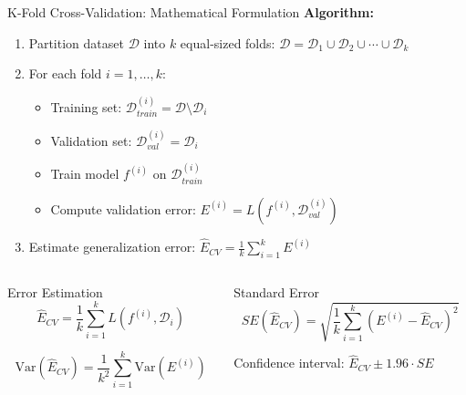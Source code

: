 \documentclass[8pt,aspectratio=1610]{beamer}
\begin{document}
\begin{frame}{K-Fold Cross-Validation: Mathematical Formulation}
\textbf{Algorithm:}
\begin{enumerate}
\setlength{\itemsep}{3pt}
\item Partition dataset $\mathcal{D}$ into $k$ equal-sized folds: $\mathcal{D} = \mathcal{D}_1 \cup \mathcal{D}_2 \cup \cdots \cup \mathcal{D}_k$
\item For each fold $i = 1, \ldots, k$:
\begin{itemize}
\item Training set: $\mathcal{D}_{train}^{(i)} = \mathcal{D} \setminus \mathcal{D}_i$
\item Validation set: $\mathcal{D}_{val}^{(i)} = \mathcal{D}_i$
\item Train model $f^{(i)}$ on $\mathcal{D}_{train}^{(i)}$
\item Compute validation error: $E^{(i)} = L(f^{(i)}, \mathcal{D}_{val}^{(i)})$
\end{itemize}
\item Estimate generalization error: $\hat{E}_{CV} = \frac{1}{k}\sum_{i=1}^k E^{(i)}$
\end{enumerate}

\vspace{0.3cm}

\begin{columns}[t]
\begin{column}{0.48\textwidth}
\begin{block}{Error Estimation}
$$\hat{E}_{CV} = \frac{1}{k}\sum_{i=1}^k L(f^{(i)}, \mathcal{D}_i)$$

$$\text{Var}(\hat{E}_{CV}) = \frac{1}{k^2}\sum_{i=1}^k \text{Var}(E^{(i)})$$
\end{block}
\end{column}

\begin{column}{0.48\textwidth}
\begin{block}{Standard Error}
$$SE(\hat{E}_{CV}) = \sqrt{\frac{1}{k}\sum_{i=1}^k \left(E^{(i)} - \hat{E}_{CV}\right)^2}$$

Confidence interval: $\hat{E}_{CV} \pm 1.96 \cdot SE$
\end{block}
\end{column}
\end{columns}
\end{frame}
\end{document}
